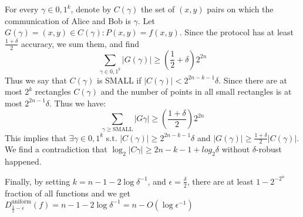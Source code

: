 \documentclass[11pt, fleqn, a4paper]{report}
\begin{document}
For every $\gamma \in {0,1}^k$, denote by $C(\gamma)$ the set of $(x,y)$ pairs on which the communication of Alice and Bob is $\gamma$. Let $G(\gamma) = {(x,y) \in C(\gamma) : P(x,y) = f(x,y)}$. Since the protocol has at least $\frac{1+\delta}{2}$ accuracy, we sum them, and find
$$\sum_{\gamma \in {0,1}^k}{|G(\gamma)| \geq (\frac{1}{2} + \delta)2^{2n} }$$
Thus we say that $C(\gamma)$ is SMALL if $|C(\gamma)| < 2^{2n - k - 1}\delta$. Since there are at most $2^k$ rectangles $C(\gamma)$ and the number of points in all small rectangles is at most $2^{2n - 1}\delta$. Thus we have:
$$\sum_{\gamma \geq \mathrm{SMALL}}{|G{\gamma}| \geq (\frac{1 + \delta}{2})2^{2n}}$$
This implies that $\exists \gamma \in {0,1}^k$ s.t. $|C(\gamma)| \geq 2^{2n-k-1}\delta$ and $|G(\gamma)| \geq \frac{1 + \delta}{2}|C(\gamma)|$. We find a contradiction that $\log_2{|C{\gamma}|} \geq 2n - k - 1 + log_2{\delta}$ without $\delta$-robust happened.

Finally, by setting $k = n - 1 - 2\log{\delta^{-1}}$, and $\epsilon = \frac{\delta}{2}$, there are at least $1-2^{-2^n}$ fraction of all functions and we get $D_{\frac{1}{2}-\epsilon}^{\mathrm{uniform}}(f) = n - 1 - 2\log{\delta^{-1}} = n - O(\log{\epsilon^{-1}})$
\end{document}
